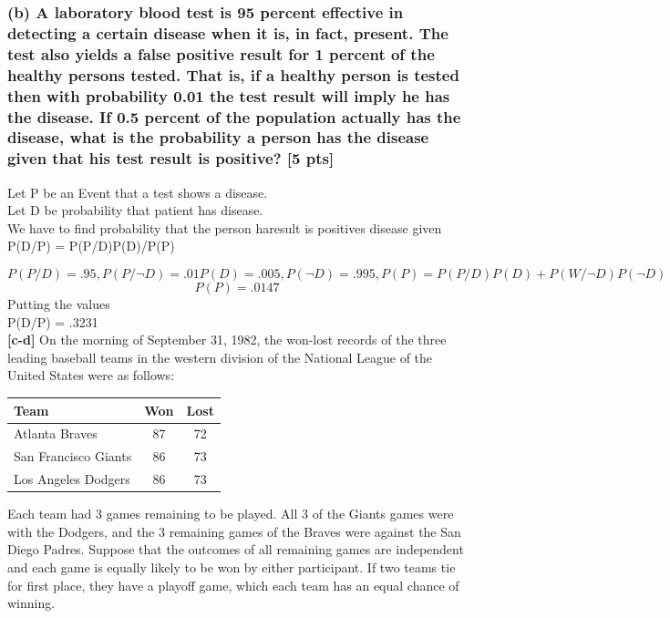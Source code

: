 \documentclass[twoside,10pt]{article}
\begin{document}
\subsubsection*{(b) A laboratory blood test is 95 percent effective in detecting a certain disease when it is, in fact, present. The test also yields a false positive result for 1 percent of the healthy persons tested. That is, if a healthy person is tested then with probability 0.01 the test result will imply he has the disease. If 0.5 percent of the population actually has the disease, what is the probability a person has the disease given that his test result is positive? [5 pts]}
 Let P be an Event that a test shows a disease.\\[.25cm]
Let D be probability that patient has disease.\\[.25cm]
We have to find probability that the person haresult is positives disease given 
P(D/P) = P(P/D)P(D)/P(P)

$$
P(P/D) = .95,
P(P/\neg D) = .01
P(D) = .005,
P(\neg D) = .995,
P(P) = P(P/D)P(D) + P(W/\neg D)P(\neg D) 
$$
$$
P(P)=  .0147
$$
Putting the values \\
P(D/P) = .3231\\[.55cm]
\textbf{[c-d]} On the morning of September 31, 1982, the won-lost records of the three leading baseball teams in the western division of the National League of the United States were as follows:

\begin{table}[!h]
\centering \small
\begin{tabular}{l|c|c}
  \hline
  Team & Won & Lost\\
  \hline \hline
  Atlanta Braves & 87 & 72\\
  San Francisco Giants & 86 & 73\\
  Los Angeles Dodgers & 86 & 73\\
  \hline
\end{tabular}
\end{table}

Each team had 3 games remaining to be played. All 3 of the Giants games were with the Dodgers, and the 3 remaining games of the Braves were against the San Diego Padres. Suppose that the outcomes of all remaining games are independent and each game is equally likely to be won by either participant. If two teams tie for first place, they have a playoff game, which each team has an equal chance of winning.
\end{document}
